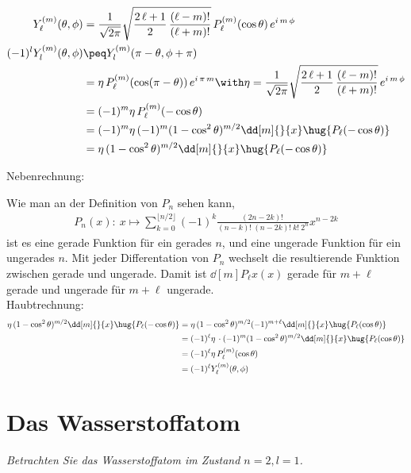 \documentclass[ex,minted]{exercise_4.0}
\begin{document}
\dottedlinete

\begin{align*}
    Y_\ell^{(m)}(\theta, \phi) &= \frac{1}{\sqrt{2\pi}}\sqrt{\frac{2\,\ell + 1}{2} \, \frac{(\ell - m)!}{(\ell + m)!}} \, P_\ell^{(m)}(\cos \theta) \, e^{i\,m\,\phi}\\
    (-1)^l Y_l^{(m)}(\theta,\phi) &\peq 
    Y_l^{(m)} (\pi-\theta,\phi+\pi)\\
    &= \eta \, P_\ell^{(m)}(\cos (\pi-\theta)) \, e^{i\,\pi\,m} \with \eta = \frac{1}{\sqrt{2\pi}}\sqrt{\frac{2\,\ell + 1}{2} \, \frac{(\ell - m)!}{(\ell + m)!}} \, e^{i\,m\,\phi}\\
    &= (-1)^m \eta \, P_\ell^{(m)}(-\cos\theta)\\
    &= (-1)^m \eta \, (-1)^m (1-\cos^2\theta)^{m/2} \dd[m]{}{x}\hug{P_\ell(-\cos\theta)}\\
    &= \eta\,  (1-\cos^2\theta)^{m/2} \dd[m]{}{x}\hug{P_\ell(-\cos\theta)}\\
\end{align*}

Nebenrechnung: 

Wie man an der Definition von \(P_n\) sehen kann, 
\begin{align*}
    P_n(x): \ x\mapsto \sum_{k=0}^{\lfloor n/2\rfloor} (-1)^k \frac{(2n - 2k)! \ }{(n-k)! \ (n-2k)! \ k! \ 2^n} x^{n-2k}
\end{align*}
ist es eine gerade Funktion für ein gerades \(n\), und eine ungerade Funktion für ein ungerades \(n\). Mit jeder Differentation von \(P_n\) wechselt die resultierende Funktion zwischen gerade und ungerade.
Damit ist \(\dd[m]{P_\ell}x (x)\) gerade für \(m+\ell\) gerade und ungerade für \(m+\ell\) ungerade.\\

Haubtrechnung:
\begin{align*}
    \eta\,  (1-\cos^2\theta)^{m/2} \dd[m]{}{x}\hug{P_\ell(-\cos\theta)}
    &= \eta\,  (1-\cos^2\theta)^{m/2} (-1)^{m+\ell}\dd[m]{}{x}\hug{P_\ell(\cos\theta)}\\
    &= (-1)^\ell \eta\,\cdot  (-1)^{m} (1-\cos^2\theta)^{m/2} \dd[m]{}{x}\hug{P_\ell(\cos\theta)}\\
    &= (-1)^\ell \eta\,P_\ell^{(m)}(\cos\theta)\\
    &= (-1)^\ell Y_\ell^{(m)}(\theta, \phi)\\
\end{align*}

\section{Das Wasserstoffatom}
{\it Betrachten Sie das Wasserstoffatom im Zustand \(n=2,l=1\).}
\end{document}
